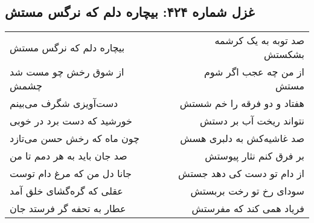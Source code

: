 \begin{center}
\section*{غزل شماره ۴۲۴: بیچاره دلم که نرگس مستش}
\label{sec:424}
\begin{longtable}{l p{0.5cm} r}
بیچاره دلم که نرگس مستش
&&
صد توبه به یک کرشمه بشکستش
\\
از شوق رخش چو مست شد چشمش
&&
از من چه عجب اگر شوم مستش
\\
دست‌آویزی شگرف می‌بینم
&&
هفتاد و دو فرقه را خم شستش
\\
خورشید که دست برد در خوبی
&&
نتواند ریخت آب بر دستش
\\
چون ماه که رخش حسن می‌تازد
&&
صد غاشیه‌کش به دلبری هسش
\\
صد جان باید به هر دمم تا من
&&
بر فرق کنم نثار پیوستش
\\
جانا دل من که مرغ دام توست
&&
از دام تو دست کی دهد جستش
\\
عقلی که گره‌گشای خلق آمد
&&
سودای رخ تو رخت بربستش
\\
عطار به تحفه گر فرستد جان
&&
فریاد همی کند که مفرستش
\\
\end{longtable}
\end{center}
